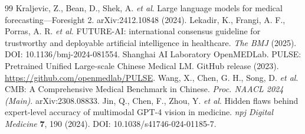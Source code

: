\begin{thebibliography}{99}
 Kraljevic, Z., Bean, D., Shek, A. \textit{et al}. Large language models for medical forecasting---Foresight 2. arXiv:2412.10848 (2024).
 Lekadir, K., Frangi, A. F., Porras, A. R. \textit{et al}. FUTURE-AI: international consensus guideline for trustworthy and deployable artificial intelligence in healthcare. \textit{The BMJ} (2025). DOI: 10.1136/bmj-2024-081554.
 Shanghai AI Laboratory OpenMEDLab. PULSE: Pretrained Unified Large-scale Chinese Medical LM. GitHub release (2023). \url{https://github.com/openmedlab/PULSE}.
 Wang, X., Chen, G. H., Song, D. \textit{et al}. CMB: A Comprehensive Medical Benchmark in Chinese. \textit{Proc. NAACL 2024 (Main)}. arXiv:2308.08833.
 Jin, Q., Chen, F., Zhou, Y. \textit{et al}. Hidden flaws behind expert-level accuracy of multimodal GPT-4 vision in medicine. \textit{npj Digital Medicine} \textbf{7}, 190 (2024). DOI: 10.1038/s41746-024-01185-7.

\end{thebibliography}
